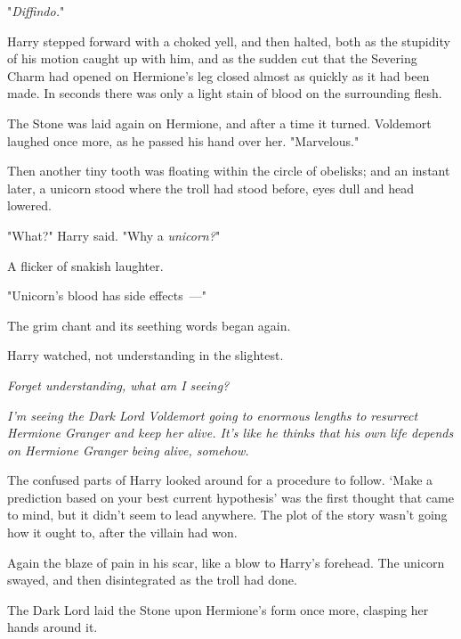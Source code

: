 "\emph{Diffindo.}"

Harry stepped forward with a choked yell, and then halted, both as the
stupidity of his motion caught up with him, and as the sudden cut that the
Severing Charm had opened on Hermione's leg closed almost as quickly as it had
been made. In seconds there was only a light stain of blood on the surrounding
flesh.

The Stone was laid again on Hermione, and after a time it turned. Voldemort
laughed once more, as he passed his hand over her. "Marvelous."

Then another tiny tooth was floating within the circle of obelisks; and an
instant later, a unicorn stood where the troll had stood before, eyes dull and
head lowered.

"What?" Harry said. "Why a \emph{unicorn?}"

 A flicker of snakish laughter. 

"Unicorn's blood has side effects~---"


The grim chant and its seething words began again.

Harry watched, not understanding in the slightest.

\emph{Forget understanding, what am I seeing?}

\emph{I'm seeing the Dark Lord Voldemort going to enormous lengths to resurrect
Hermione Granger and keep her alive. It's like he thinks that his own life
depends on Hermione Granger being alive, somehow.}

The confused parts of Harry looked around for a procedure to follow. `Make a
prediction based on your best current hypothesis' was the first thought that
came to mind, but it didn't seem to lead anywhere. The plot of the story wasn't
going how it ought to, after the villain had won.

Again the blaze of pain in his scar, like a blow to Harry's forehead. The
unicorn swayed, and then disintegrated as the troll had done.

The Dark Lord laid the Stone upon Hermione's form once more, clasping her hands
around it.

